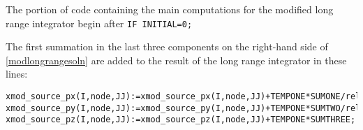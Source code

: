 \documentclass[oneside,12pt]{book}
\begin{document}

The portion of code containing the main computations for the modified long range integrator begin after
\texttt{IF INITIAL=0;}

The first summation in the last three components on the right-hand side of \eqref{modlongrangesoln} are added to the result of the long range integrator in these lines:
\begin{small}
\begin{lstlisting}
xmod_source_px(I,node,JJ):=xmod_source_px(I,node,JJ)+TEMPONE*SUMONE/relg;
xmod_source_py(I,node,JJ):=xmod_source_py(I,node,JJ)+TEMPONE*SUMTWO/relg;
xmod_source_pz(I,node,JJ):=xmod_source_pz(I,node,JJ)+TEMPONE*SUMTHREE;
\end{lstlisting} 
\end{small}
\end{document}
